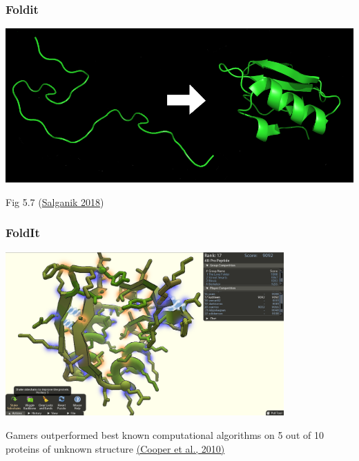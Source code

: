\documentclass[aspectratio=169]{beamer}
\begin{document}
\begin{frame}
\frametitle{Foldit}

\begin{center}
\includegraphics[width=\textwidth]{figures/bitbybit5-7_protein_folding.png}
\end{center}

\vfill
Fig 5.7 (\href{https://www.bitbybitbook.com/}{Salganik 2018})

\end{frame}
\begin{frame}
\frametitle{FoldIt}

\begin{center}
\includegraphics[width=0.8\textwidth]{figures/foldit_action}
\end{center}

\vfill
\pause
Gamers outperformed best known computational algorithms on 5 out of 10 proteins of unknown structure \href{https://rdcu.be/b4th5}{(Cooper et al., 2010)}

\end{frame}
\end{document}
